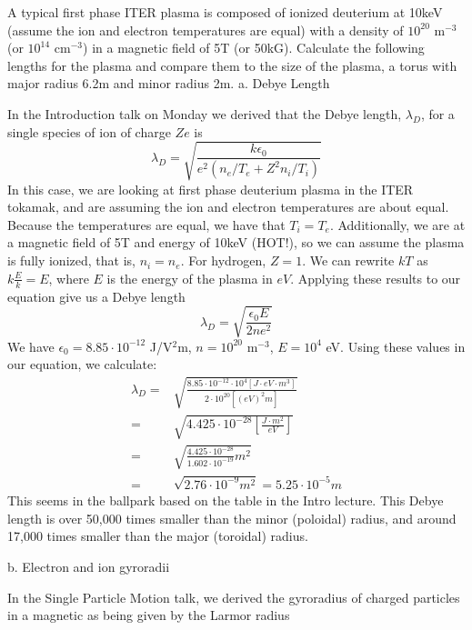 \documentclass[12pt]{article}
\newenvironment{problem}[2][Problem]
{
	\begin{trivlist} 
		\item[\hskip \labelsep {\bfseries #1 #2:}]
	}
{
	\end{trivlist}
	}
\newenvironment{solution}[1][Solution]
{
	\begin{trivlist} 
		\item[\hskip \labelsep {\itshape #1:}]
	}
	{
	\end{trivlist}
}
\begin{document}
\begin{problem}{1}
A typical first phase ITER plasma is composed of ionized deuterium at 10keV (assume the ion and electron temperatures are equal) with a density of $10^{20} $ m$^{-3} $ (or $10^{14} $ cm$^{-3}$) in a magnetic field of 5T (or 50kG). Calculate the following lengths for the plasma and compare them to the size of the plasma, a torus with major radius 6.2m and minor radius 2m.
\noindent
\newline
\newline
a. Debye Length
\begin{solution}
In the Introduction talk on Monday we derived that the Debye length, $\lambda_D$, for a single species of ion of charge $Ze$ is
\[
\lambda_D = \sqrt{\frac{k \epsilon_{0}}{e^2 (n_e / T_e + Z^2 n_i / T_i)}}
\] 
In this case, we are looking at first phase deuterium plasma in the ITER tokamak, and are assuming the ion and electron temperatures are about equal. Because the temperatures are equal, we have that $T_i = T_e$. Additionally, we are at a magnetic field of 5T and energy of 10keV (HOT!), so we can assume the plasma is fully ionized, that is, $n_i = n_e$. For hydrogen, $Z=1$. We can rewrite $kT$ as $k\frac{E}{k} = E$, where $E$ is the energy of the plasma in $eV$. Applying these results to our equation give us a Debye length
\[
\lambda_D = \sqrt{\frac{\epsilon_0 E}{2n e^2}}
\]
We have $\epsilon_0 = 8.85 \cdot 10^{-12}$ J/V$^{2}$m, $n = 10^{20}$ m$^{-3}$, $E = 10^4$ eV. Using these values in our equation, we calculate:
\begin{align*}
\lambda_D =& \sqrt{\frac{8.85 \cdot 10^{-12} \cdot 10^4 [J \cdot eV \cdot m^3 ]}{2 \cdot 10^{20} [ (eV)^2 m]}}\\
=& \sqrt{4.425 \cdot 10^{-28} \left[ \frac{J \cdot m^2}{eV} \right] }\\
=& \sqrt{\frac{4.425 \cdot 10^{-28}} {1.602\cdot 10^{-19}} m^2}\\
=& \sqrt{2.76 \cdot 10^{-9} m^2} = 5.25\cdot 10^{-5} m
\end{align*}
This seems in the ballpark based on the table in the Intro lecture. This Debye length is over 50,000 times smaller than the minor (poloidal) radius, and around 17,000 times smaller than the major (toroidal) radius.
\end{solution}
\noindent
\newline
\newline
b. Electron and ion gyroradii
\begin{solution}
In the Single Particle Motion talk, we derived the gyroradius of charged particles in a magnetic as being given by the Larmor radius

\end{solution}
\end{problem}
\end{document}
